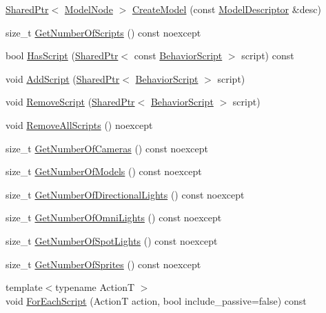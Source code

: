 \begin{DoxyCompactItemize}
\item 
\hyperlink{namespacemage_a1e01ae66713838a7a67d30e44c67703e}{Shared\+Ptr}$<$ \hyperlink{classmage_1_1_model_node}{Model\+Node} $>$ \hyperlink{classmage_1_1_scene_a9d6c27c761cd4535549c8af2e3804b7d}{Create\+Model} (const \hyperlink{classmage_1_1_model_descriptor}{Model\+Descriptor} \&desc)
\item 
size\+\_\+t \hyperlink{classmage_1_1_scene_a33cecd2fd2b393ccac84b94ec8cc53c0}{Get\+Number\+Of\+Scripts} () const noexcept
\item 
bool \hyperlink{classmage_1_1_scene_a9dd6c49e9db7590de1de4fbd128c78a9}{Has\+Script} (\hyperlink{namespacemage_a1e01ae66713838a7a67d30e44c67703e}{Shared\+Ptr}$<$ const \hyperlink{classmage_1_1_behavior_script}{Behavior\+Script} $>$ script) const
\item 
void \hyperlink{classmage_1_1_scene_ab97b66c81c32681699052e154d0e0722}{Add\+Script} (\hyperlink{namespacemage_a1e01ae66713838a7a67d30e44c67703e}{Shared\+Ptr}$<$ \hyperlink{classmage_1_1_behavior_script}{Behavior\+Script} $>$ script)
\item 
void \hyperlink{classmage_1_1_scene_a82705ba56543dea410439760b1667bc5}{Remove\+Script} (\hyperlink{namespacemage_a1e01ae66713838a7a67d30e44c67703e}{Shared\+Ptr}$<$ \hyperlink{classmage_1_1_behavior_script}{Behavior\+Script} $>$ script)
\item 
void \hyperlink{classmage_1_1_scene_af610ef656fa46cb88638f1356ecee6a8}{Remove\+All\+Scripts} () noexcept
\item 
size\+\_\+t \hyperlink{classmage_1_1_scene_a7b0a49510128a1e9dbc64a657fe9ec7a}{Get\+Number\+Of\+Cameras} () const noexcept
\item 
size\+\_\+t \hyperlink{classmage_1_1_scene_aa5092da49a901a02802d7f1532b75210}{Get\+Number\+Of\+Models} () const noexcept
\item 
size\+\_\+t \hyperlink{classmage_1_1_scene_afd3b87bc2e2212890ff4c7a761c29684}{Get\+Number\+Of\+Directional\+Lights} () const noexcept
\item 
size\+\_\+t \hyperlink{classmage_1_1_scene_ac043f20c6cf845244a3258593b3c2814}{Get\+Number\+Of\+Omni\+Lights} () const noexcept
\item 
size\+\_\+t \hyperlink{classmage_1_1_scene_af7bdbd447a50beb83ae5573f7e5505db}{Get\+Number\+Of\+Spot\+Lights} () const noexcept
\item 
size\+\_\+t \hyperlink{classmage_1_1_scene_a124042421abfee563342e50032d4051f}{Get\+Number\+Of\+Sprites} () const noexcept
\item 
{\footnotesize template$<$typename ActionT $>$ }\\void \hyperlink{classmage_1_1_scene_a217ee5824ebed8465c91706ef551edcc}{For\+Each\+Script} (ActionT action, bool include\+\_\+passive=false) const

\end{DoxyCompactItemize}
